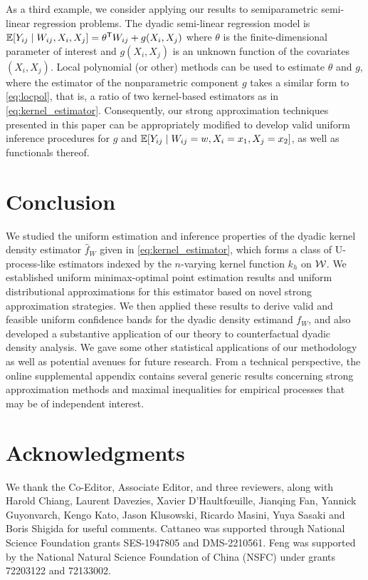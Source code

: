 As a third example, we consider applying our results to
semiparametric semi-linear regression problems.
The dyadic semi-linear regression model is
%
$\mathbb{E}[Y_{ij} \mid W_{ij}, X_i, X_j]
= \theta^{\mathsf{T}} W_{ij} + g(X_i, X_j)$
%
where $\theta$ is the finite-dimensional parameter
of interest
and $g(X_i, X_j)$ is an unknown
function of the covariates
$(X_i, X_j)$.
Local polynomial (or other) methods can be used to
estimate $\theta$ and $g$,
where the estimator of the nonparametric component
$g$ takes a similar form to \eqref{eq:locpol},
that is, a ratio of two kernel-based
estimators as in \eqref{eq:kernel_estimator}.
Consequently, our strong approximation techniques
presented in this paper can be appropriately modified
to develop valid uniform inference procedures for
$g$ and $\mathbb{E}[Y_{ij} \mid W_{ij}=w, X_i=x_1, X_j=x_2]$,
as well as functionals thereof.

\section{Conclusion}
\label{sec:conclusion}

We studied the uniform estimation and inference properties of the
dyadic kernel density estimator
$\widehat{f}_W$ given in \eqref{eq:kernel_estimator},
which forms a class
of U-process-like estimators
indexed by the $n$-varying kernel function $k_h$ on $\mathcal{W}$.
We established uniform minimax-optimal point estimation results
and uniform distributional approximations for this estimator
based on novel strong approximation strategies.
We then applied these results to derive valid
and feasible uniform confidence bands for
the dyadic density estimand $f_W$,
and also developed a substantive application of our theory to
counterfactual dyadic density analysis.
We gave some other statistical
applications of our methodology as well as
potential avenues for future research.
From a technical perspective,
the online supplemental appendix contains several generic results
concerning strong approximation methods and maximal inequalities
for empirical processes that may be of independent interest.

\section*{Acknowledgments}

We thank the Co-Editor, Associate Editor, and three reviewers,
along with
Harold Chiang,
Laurent Davezies,
Xavier D'Haultf{\oe}uille,
Jianqing Fan,
Yannick Guyonvarch,
Kengo Kato,
Jason Klusowski,
Ricardo Masini,
Yuya Sasaki
and Boris Shigida
for useful comments.
Cattaneo was supported through
National Science Foundation grants SES-1947805 and DMS-2210561.
Feng was supported by the
National Natural Science Foundation of China (NSFC)
under grants 72203122 and 72133002.

